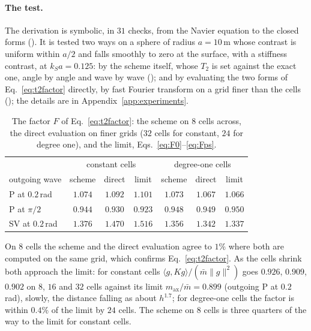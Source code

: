 \documentclass[11pt,a4paper]{article}
\begin{document}
\paragraph{The test.} The derivation is symbolic, in $31$ checks, from the Navier equation to the closed
forms (). It is tested two ways on a sphere of radius
$a=10$\,m whose contrast is uniform within $a/2$ and falls smoothly to zero at the surface, with a
stiffness contrast, at $k_Sa=0.125$: by the scheme itself,
whose $T_2$ is set against the exact one, angle by angle and wave by wave
(); and by evaluating the two forms of Eq.~\eqref{eq:t2factor}
directly, by fast Fourier transform on a grid finer than the cells (); the details are in Appendix~\ref{app:experiments}.
\begin{table}[htbp]
\centering
\caption{The factor $F$ of Eq.~\eqref{eq:t2factor}: the scheme on $8$ cells across, the direct
evaluation on finer grids ($32$ cells for constant, $24$ for degree one), and the limit,
Eqs.~\eqref{eq:F0}--\eqref{eq:Fps}.}\label{tab:t2factor}
\small
\begin{tabular}{@{}lcccccc@{}}
\toprule
 & \multicolumn{3}{c}{constant cells} & \multicolumn{3}{c}{degree-one cells} \\
outgoing wave & scheme & direct & limit & scheme & direct & limit \\
\midrule
P at $0.2$\,rad & $1.074$ & $1.092$ & $1.101$ & $1.073$ & $1.067$ & $1.066$ \\
P at $\pi/2$    & $0.944$ & $0.930$ & $0.923$ & $0.948$ & $0.949$ & $0.950$ \\
SV at $0.2$\,rad & $1.376$ & $1.470$ & $1.516$ & $1.356$ & $1.342$ & $1.337$ \\
\bottomrule
\end{tabular}
\end{table}
On $8$ cells the scheme and the direct evaluation agree to $1\%$ where both are computed on the same
grid, which confirms Eq.~\eqref{eq:t2factor}. As the cells shrink both approach the limit: for constant
cells $\langle g,Kg\rangle/(\bar m\lVert g\rVert^2)$ goes $0.926$, $0.909$, $0.902$ on $8$, $16$ and
$32$ cells against its limit $m_{\mathrm{ax}}/\bar m=0.899$ (outgoing P at $0.2$\,rad), slowly, the
distance falling as about $h^{1.7}$; for degree-one cells the factor is within $0.4\%$ of the limit by $24$
cells. The scheme on $8$ cells is three quarters of the way to the limit
for constant cells.
\end{document}
